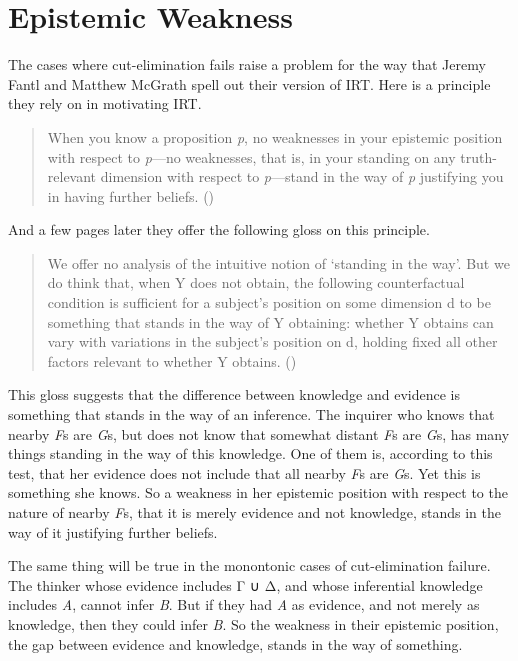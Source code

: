 \documentclass[
  10pt,
  letterpaper,
  twoside]{scrbook}
\begin{document}
\section{Epistemic Weakness}\label{sec-weakness}

The cases where cut-elimination fails raise a problem for the way that
Jeremy Fantl and Matthew McGrath spell out their version of IRT. Here is
a principle they rely on in motivating IRT.

\begin{quote}
When you know a proposition \emph{p}, no weaknesses in your epistemic
position with respect to \emph{p}---no weaknesses, that is, in your
standing on any truth-relevant dimension with respect to
\emph{p}---stand in the way of \emph{p} justifying you in having further
beliefs. ()
\end{quote}

And a few pages later they offer the following gloss on this principle.

\begin{quote}
We offer no analysis of the intuitive notion of `standing in the way'.
But we do think that, when Y does not obtain, the following
counterfactual condition is sufficient for a subject's position on some
dimension d to be something that stands in the way of Y obtaining:
whether Y obtains can vary with variations in the subject's position on
d, holding fixed all other factors relevant to whether Y obtains.
()
\end{quote}

This gloss suggests that the difference between knowledge and evidence
is something that stands in the way of an inference. The inquirer who
knows that nearby \emph{F}s are \emph{G}s, but does not know that
somewhat distant \emph{F}s are \emph{G}s, has many things standing in
the way of this knowledge. One of them is, according to this test, that
her evidence does not include that all nearby \emph{F}s are \emph{G}s.
Yet this is something she knows. So a weakness in her epistemic position
with respect to the nature of nearby \emph{F}s, that it is merely
evidence and not knowledge, stands in the way of it justifying further
beliefs.

The same thing will be true in the monontonic cases of cut-elimination
failure. The thinker whose evidence includes Γ ∪ Δ, and whose
inferential knowledge includes \emph{A}, cannot infer \emph{B}. But if
they had \emph{A} as evidence, and not merely as knowledge, then they
could infer \emph{B}. So the weakness in their epistemic position, the
gap between evidence and knowledge, stands in the way of something.
\end{document}
